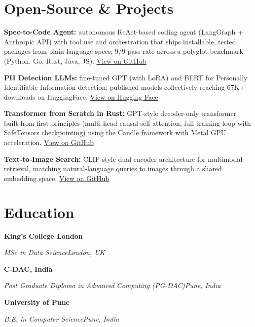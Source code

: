 \documentclass[10pt,a4paper]{article}
\newcommand{\entry}[4]{%
  {\color{company}\bfseries #1}\hfill {\color{muted}#2}\par
  \vspace{1pt}
  {\itshape #3}\hfill {\color{muted}\itshape #4}\par
  \vspace{3pt}%
}
\begin{document}
\section{Open-Source \& Projects}
\begin{tight}
  \item \textbf{Spec-to-Code Agent:} autonomous ReAct-based coding agent (LangGraph + Anthropic API) with tool use and orchestration that ships installable, tested packages from plain-language specs; 9/9 pass rate across a polyglot benchmark (Python, Go, Rust, Java, JS). \href{https://github.com/abhijeetscode/Spec-to-Code-Agent}{View on GitHub}
  \item \textbf{PII Detection LLMs:} fine-tuned GPT (with LoRA) and BERT for Personally Identifiable Information detection; published models collectively reaching 67K+ downloads on HuggingFace. \href{https://huggingface.co/ab-ai/pii_model}{View on Hugging Face}
  \item \textbf{Transformer from Scratch in Rust:} GPT-style decoder-only transformer built from first principles (multi-head causal self-attention, full training loop with SafeTensors checkpointing) using the Candle framework with Metal GPU acceleration. \href{https://github.com/abhijeetscode/transformer-rust}{View on GitHub}
  \item \textbf{Text-to-Image Search:} CLIP-style dual-encoder architecture for multimodal retrieval, matching natural-language queries to images through a shared embedding space. \href{https://github.com/abhijeetscode/text-to-image-search}{View on GitHub}
\end{tight}

\section{Education}
\entry{King's College London}{}{MSc in Data Science}{London, UK}
\vspace{-3pt}
\entry{C-DAC, India}{}{Post Graduate Diploma in Advanced Computing (PG-DAC)}{Pune, India}
\vspace{-3pt}
\entry{University of Pune}{}{B.E. in Computer Science}{Pune, India}
\end{document}
